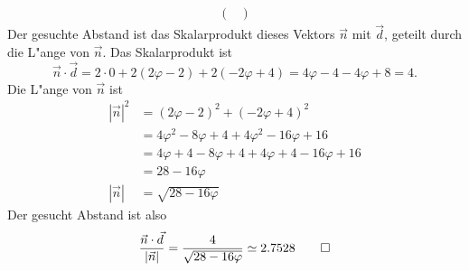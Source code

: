 \begin{loesung}
\begin{align*}
\begin{pmatrix}
\end{pmatrix}
\end{align*}
Der gesuchte Abstand ist das Skalarprodukt dieses Vektors $\vec n$
mit $\vec d$, geteilt durch die L"ange von $\vec n$. Das Skalarprodukt
ist
\[
\vec n\cdot\vec d=2\cdot 0+2(2\varphi-2)+2(-2\varphi+4)
=4\varphi-4-4\varphi+8=4.
\]
Die L"ange von $\vec n$ ist
\begin{align*}
|\vec n|^2&=(2\varphi-2)^2+(-2\varphi+4)^2\\
&=4 \varphi^2-8\varphi+4+4\varphi^2-16\varphi+16\\
&=4\varphi+4-8\varphi+4+4\varphi+4-16\varphi+16\\
&=28-16\varphi\\
|\vec n|&=\sqrt{28-16\varphi}
\end{align*}
Der gesucht Abstand ist also
\[
\frac{\vec n\cdot \vec d}{|\vec n|}=\frac{4}{\sqrt{28-16\varphi}}\simeq
2.7528
\qedhere
\]
\end{loesung}

